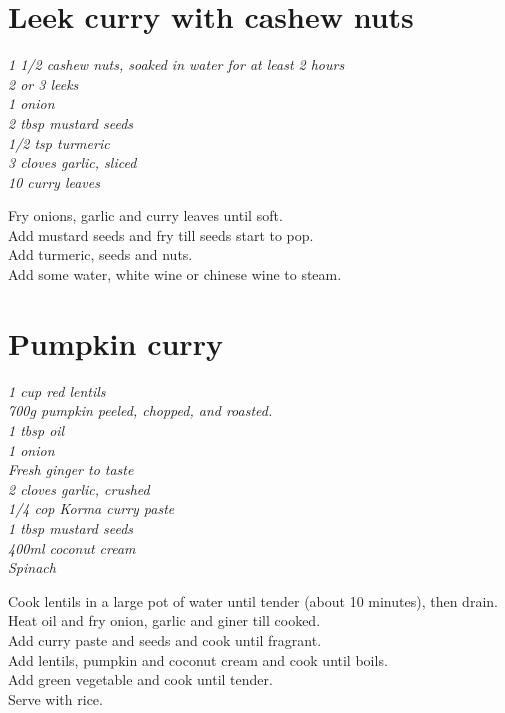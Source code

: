 \documentclass{tufte-book}
\begin{document}
\section{Leek curry with cashew nuts}
\emph{1 1/2 cashew nuts, soaked in water for at least 2 hours
\\2 or 3 leeks
\\1 onion
\\2 tbsp mustard seeds
\\1/2 tsp turmeric
\\3 cloves garlic, sliced
\\10 curry leaves
}

Fry onions, garlic and curry leaves until soft.
\\Add mustard seeds and fry till seeds start to pop.
\\Add turmeric, seeds and nuts.
\\Add some water, white wine or chinese wine to steam.


\section{Pumpkin curry}
\emph{1 cup red lentils
\\700g pumpkin peeled, chopped, and roasted.
\\1 tbsp oil
\\1 onion
\\Fresh ginger to taste
\\2 cloves garlic, crushed
\\1/4 cop Korma curry paste
\\1 tbsp mustard seeds
\\400ml coconut cream
\\Spinach{}}

Cook lentils in a large pot of water until tender (about 10 minutes), then drain.
\\Heat oil and fry onion, garlic and giner till cooked. 
\\Add curry paste and seeds and cook until fragrant.
\\Add lentils, pumpkin and coconut cream and cook until boils.
\\Add green vegetable and cook until tender.
\\Serve with rice.
\end{document}
